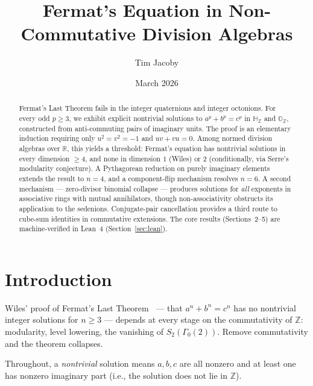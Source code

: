 \documentclass[11pt]{amsart}
\title{Fermat's Equation in Non-Commutative Division Algebras}
\author{Tim Jacoby}
\date{March 2026}
\theoremstyle{plain}
\theoremstyle{definition}
\theoremstyle{remark}
\newcommand{\Z}{\mathbb{Z}}
\newcommand{\R}{\mathbb{R}}
\newcommand{\HH}{\mathbb{H}}
\newcommand{\OO}{\mathbb{O}}
\begin{document}

\begin{abstract}
Fermat's Last Theorem fails in the integer quaternions and integer octonions.
For every odd $p \geq 3$, we exhibit explicit nontrivial solutions to
$a^p + b^p = c^p$ in $\HH_\Z$ and $\OO_\Z$, constructed from
anti-commuting pairs of imaginary units.
The proof is an elementary induction requiring only $u^2 = v^2 = -1$ and $uv + vu = 0$.
Among normed division algebras over $\R$, this yields a threshold:
Fermat's equation has nontrivial solutions in every dimension $\geq 4$,
and none in dimension $1$ (Wiles) or $2$ (conditionally, via
Serre's modularity conjecture).
A Pythagorean reduction on purely imaginary elements extends
the result to $n = 4$, and a component-flip mechanism resolves $n = 6$.
A second mechanism --- zero-divisor binomial collapse --- produces solutions
for \emph{all} exponents in associative rings with mutual annihilators,
though non-associativity obstructs its application to the sedenions.
Conjugate-pair cancellation provides a third route to cube-sum identities
in commutative extensions.
The core results (Sections~2--5) are machine-verified in Lean~4
(Section~\ref{sec:lean}).
\end{abstract}

\maketitle


\section{Introduction}\label{sec:intro}

Wiles' proof of Fermat's Last Theorem~\cite{Wiles1995} --- that $a^n + b^n = c^n$
has no nontrivial integer solutions for $n \geq 3$ --- depends at every stage on the
commutativity of $\Z$: modularity, level lowering, the vanishing of $S_2(\Gamma_0(2))$.
Remove commutativity and the theorem collapses.

Throughout, a \emph{nontrivial} solution means $a, b, c$ are all nonzero
and at least one has nonzero imaginary part (i.e., the solution does not
lie in $\Z$).
\end{document}
